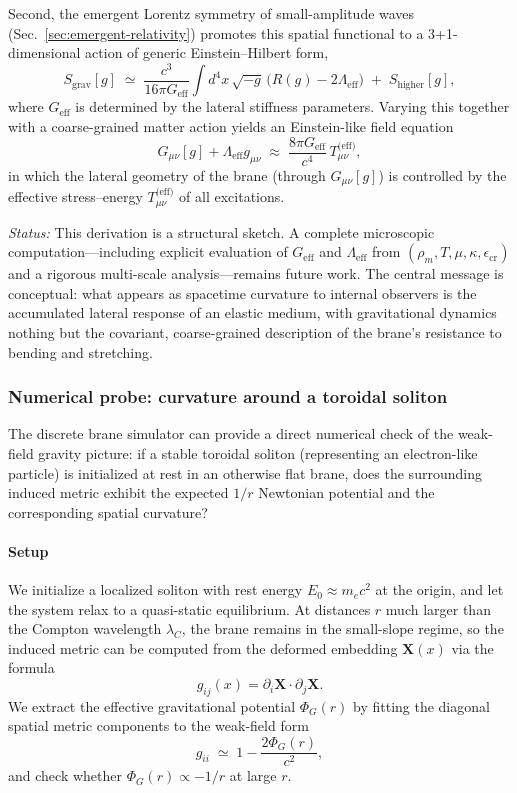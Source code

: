 Second, the emergent Lorentz symmetry of small-amplitude waves (Sec.~\ref{sec:emergent-relativity}) promotes this spatial functional to a 3+1-dimensional action of generic Einstein--Hilbert form,
\begin{equation}
S_\text{grav}[g]
\;\simeq\;
\frac{c^3}{16\pi G_\text{eff}}
\int d^4x\,\sqrt{-g}\,\bigl(
R(g) - 2\Lambda_\text{eff}
\bigr)
\;+\;
S_\text{higher}[g],
\end{equation}
where $G_\text{eff}$ is determined by the lateral stiffness parameters. Varying this together with a coarse-grained matter action yields an Einstein-like field equation
\begin{equation}
G_{\mu\nu}[g] + \Lambda_\text{eff} g_{\mu\nu}
\;\approx\;
\frac{8\pi G_\text{eff}}{c^4}\,T_{\mu\nu}^\text{(eff)},
\end{equation}
in which the lateral geometry of the brane (through $G_{\mu\nu}[g]$) is controlled by the effective stress--energy $T_{\mu\nu}^\text{(eff)}$ of all excitations.

\textit{Status:} This derivation is a structural sketch. A complete microscopic computation---including explicit evaluation of $G_\text{eff}$ and $\Lambda_\text{eff}$ from $(\rho_m,T,\mu,\kappa,\epsilon_\text{cr})$ and a rigorous multi-scale analysis---remains future work. The central message is conceptual: what appears as spacetime curvature to internal observers is the accumulated lateral response of an elastic medium, with gravitational dynamics nothing but the covariant, coarse-grained description of the brane's resistance to bending and stretching.

\subsubsection{Numerical probe: curvature around a toroidal soliton}
\label{sec:numerical-gravity-probe}

The discrete brane simulator can provide a direct numerical check of the weak-field gravity picture: if a stable toroidal soliton (representing an electron-like particle) is initialized at rest in an otherwise flat brane, does the surrounding induced metric exhibit the expected $1/r$ Newtonian potential and the corresponding spatial curvature?

\paragraph{Setup}

We initialize a localized soliton with rest energy $E_0 \approx m_e c^2$ at the origin, and let the system relax to a quasi-static equilibrium. At distances $r$ much larger than the Compton wavelength $\lambda_C$, the brane remains in the small-slope regime, so the induced metric can be computed from the deformed embedding $\mathbf{X}(x)$ via the formula
\[
  g_{ij}(x) = \partial_i \mathbf{X} \cdot \partial_j \mathbf{X}.
\]
We extract the effective gravitational potential $\Phi_G(r)$ by fitting the diagonal spatial metric components to the weak-field form
\[
  g_{ii} \;\simeq\; 1 - \frac{2\Phi_G(r)}{c^2},
\]
and check whether $\Phi_G(r) \propto -1/r$ at large $r$.

